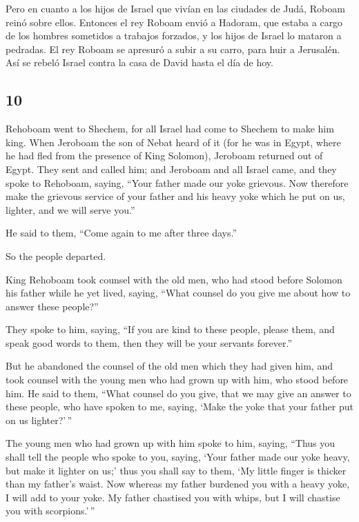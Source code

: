 \begin{paracol}{2}
 Pero en cuanto a los hijos de Israel que vivían en las
ciudades de Judá, Roboam reinó sobre ellos.  Entonces el
rey Roboam envió a Hadoram, que estaba a cargo de los hombres sometidos
a trabajos forzados, y los hijos de Israel lo mataron a pedradas. El rey
Roboam se apresuró a subir a su carro, para huir a Jerusalén.
 Así se rebeló Israel contra la casa de David hasta el
día de hoy.

\switchcolumn
\begin{otherlanguage}{english}

\hypertarget{section-19}{%
\section{10}\label{section-19}}

 Rehoboam went to Shechem, for all Israel had come to
Shechem to make him king.  When Jeroboam the son of Nebat
heard of it (for he was in Egypt, where he had fled from the presence of
King Solomon), Jeroboam returned out of Egypt.  They sent
and called him; and Jeroboam and all Israel came, and they spoke to
Rehoboam, saying,  ``Your father made our yoke grievous.
Now therefore make the grievous service of your father and his heavy
yoke which he put on us, lighter, and we will serve you.''

 He said to them, ``Come again to me after three days.''

So the people departed.

 King Rehoboam took counsel with the old men, who had
stood before Solomon his father while he yet lived, saying, ``What
counsel do you give me about how to answer these people?''

 They spoke to him, saying, ``If you are kind to these
people, please them, and speak good words to them, then they will be
your servants forever.''

 But he abandoned the counsel of the old men which they
had given him, and took counsel with the young men who had grown up with
him, who stood before him.  He said to them, ``What
counsel do you give, that we may give an answer to these people, who
have spoken to me, saying, `Make the yoke that your father put on us
lighter?'\,''

 The young men who had grown up with him spoke to him,
saying, ``Thus you shall tell the people who spoke to you, saying, `Your
father made our yoke heavy, but make it lighter on us;' thus you shall
say to them, `My little finger is thicker than my father's waist.
 Now whereas my father burdened you with a heavy yoke, I
will add to your yoke. My father chastised you with whips, but I will
chastise you with scorpions.'\,''


\end{otherlanguage}
\end{paracol}
